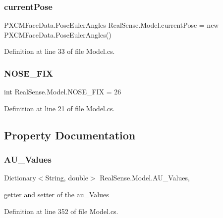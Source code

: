 \subsubsection{\texorpdfstring{current\+Pose}{currentPose}}
{\footnotesize\ttfamily P\+X\+C\+M\+Face\+Data.\+Pose\+Euler\+Angles Real\+Sense.\+Model.\+current\+Pose = new P\+X\+C\+M\+Face\+Data.\+Pose\+Euler\+Angles()}



Definition at line 33 of file Model.\+cs.

\mbox{\label{class_real_sense_1_1_model_a2f289c39689e5de8feeb82dcfb708170}} 
\subsubsection{\texorpdfstring{N\+O\+S\+E\+\_\+\+F\+IX}{NOSE\_FIX}}
{\footnotesize\ttfamily int Real\+Sense.\+Model.\+N\+O\+S\+E\+\_\+\+F\+IX = 26\hspace{0.3cm}{\ttfamily [static]}}



Definition at line 21 of file Model.\+cs.



\subsection{Property Documentation}
\mbox{\label{class_real_sense_1_1_model_a5a20efa42d5391f0a8156d45f676fc34}} 
\subsubsection{\texorpdfstring{A\+U\+\_\+\+Values}{AU\_Values}}
{\footnotesize\ttfamily Dictionary$<$String, double$>$ Real\+Sense.\+Model.\+A\+U\+\_\+\+Values\hspace{0.3cm}{\ttfamily [get]}, {\ttfamily [set]}}

getter and setter of the au\+\_\+\+Values 

Definition at line 352 of file Model.\+cs.

